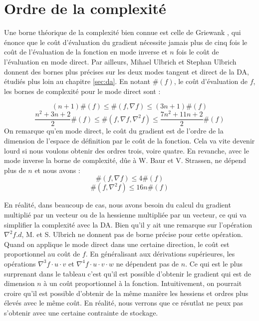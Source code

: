 \section{Ordre de la complexit\'e}
\label{chap1:ordre}
Une borne th\'eorique de la complexit\'e bien connue est celle de Griewank \cite{Iri89onautomatic}, qui \'enonce que 
le coût d'\'evaluation du gradient n\'ecessite jamais plus de cinq fois le coût de l'\'evaluation
de la fonction en mode inverse et $n$ fois le coût de l'\'evaluation en mode direct.
Par ailleurs, Mihael Ulbrich et Stephan Ulbrich \cite{Ulbrich} donnent des bornes plus pr\'ecises sur les deux modes tangent et direct
de la DA, \'etudi\'es plus loin au chapitre \ref{sec:da}.
En notant $\#(f)$, le coût d'\'evaluation de $f$, les bornes de complexit\'e pour le mode direct sont :

$$(n+1)\#(f) \leq \#(f,\nabla f)\leq (3n+1)\#(f)$$
$$\frac{n^2+3n+2}{2}\#(f) \leq \#(f,\nabla f,\nabla^2f)\leq \frac{7n^2+11n+2}{2}\#(f)$$
%
On remarque qu'en mode direct, le coût du gradient est de l'ordre de la dimension de l'espace de d\'efinition par le coût de la fonction.
Cela va vite devenir lourd si nous voulons obtenir des ordres trois, voire quatre.
En revanche, avec le mode inverse la borne de complexit\'e, dûe \`a W. Baur et V. Strassen\cite{Baur}, ne d\'epend plus de $n$ et nous avons :
\begin{equation*}
\#(f,\nabla f)\leq 4\#(f)
\end{equation*}
\begin{equation*}
\#(f,\nabla^2 f)\leq 16n\#(f)
\end{equation*}


En r\'ealit\'e, dans beaucoup de cas, nous avons besoin du calcul du gradient multipli\'e par un vecteur ou de la hessienne multipli\'ee par un vecteur, ce qui va simplifier la 
complexit\'e avec la DA.
Bien qu'il y ait une remarque sur l'op\'eration $\nabla^2 f.d $, M. et S. Ulbrich ne donnent pas de borne pr\'ecise pour cette op\'eration.
Quand on applique le mode direct dans une certaine direction, le coût est proportionnel au coût de $f$. En g\'en\'eralisant aux d\'erivations
sup\'erieures, les op\'erations $\nabla^3 f\cdot u \cdot v$ et $\nabla^4 f\cdot u \cdot v \cdot w$ ne d\'ependent pas de $n$. Ce qui est 
le plus surprenant dans le tableau c'est qu'il est possible d'obtenir le gradient qui est de dimension $n$ \`a un coût proportionnel \`a
la fonction. Intuitivement, on pourrait croire qu'il est possible d'obtenir de la même mani\`ere les hessiens et ordres plus \'elev\'es avec 
le même coût. En r\'ealit\'e, nous verrons que ce r\'esutlat ne peux pas s'obtenir avec une certaine contrainte de stockage.

